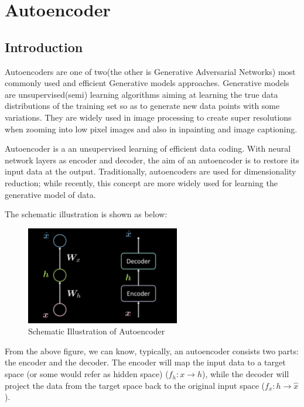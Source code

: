 \chapter{ Autoencoder }
\section{ Introduction }

Autoencoders are one of two(the other is Generative Adversarial Networks) most commonly used and efficient Generative models approaches. Generative models are unsupervised(semi) learning algorithms aiming at learning the true data distributions of the training set so as to generate new data points with some variations. They are widely used in image processing to create super resolutions when zooming into low pixel images and also in inpainting and image captioning.

Autoencoder is a an unsupervised learning of efficient data coding. With neural network layers as encoder and decoder, the aim of an autoencoder is to restore its input data at the output. Traditionally, autoencoders are used for dimensionality reduction; while recently, this concept are more widely used for learning the generative model of data.

The schematic illustration is shown as below:

\begin{figure}[htb]
    \centering
    \includegraphics[width=0.6\textwidth]{labs/10/images/Schematic_Illustration_of_Autoencoder.png}
    \caption{Schematic Illustration of Autoencoder}
    \label{fig:Schematic_Illustration_of_Autoencoder}
\end{figure}

From the above figure, we can know, typically, an autoencoder consists two parts: the encoder and the decoder. The encoder will map the input data to a target space (or some would refer as hidden space) ($f_h: x\rightarrow h$), while the decoder will project the data from the target space back to the original input space ($f_x: h\rightarrow \hat{x}$).

